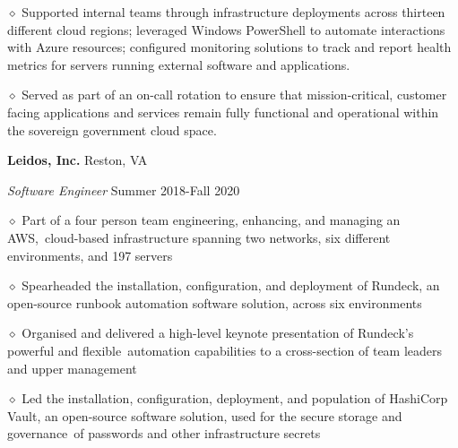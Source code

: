 \documentclass[executivepaper]{extarticle}
\begin{document}
\begin{center}
{\begin{minipage}{7.0in}
\vspace{0.25mm}

{\noindent $\diamond$ {\fontsize{12}{8}\selectfont Supported internal teams through infrastructure deployments across thirteen different cloud regions; leveraged Windows PowerShell to automate interactions with Azure resources; configured monitoring solutions to track and report health metrics for servers running external software and applications.}}

\vspace{0.25mm}

{\noindent $\diamond$ {\fontsize{12}{8}\selectfont Served as part of an on-call rotation to ensure that mission-critical, customer facing applications and services remain fully functional and operational within the sovereign government cloud space.}}

\vspace{2mm}

{\noindent \textbf{\fontsize{12}{8}\selectfont Leidos, Inc.}} {\hfill \fontsize{10}{8}\selectfont Reston, VA}

\vspace{0.5mm}

{\noindent \textit{\fontsize{12}{8}\selectfont Software Engineer}} {\hfill \fontsize{10}{8}\selectfont Summer 2018-Fall 2020}

\vspace{0.5mm}

{\noindent $\diamond$ {\fontsize{12}{8}\selectfont Part of a four person team engineering, enhancing, and managing an AWS, cloud-based infrastructure spanning two networks, six different environments, and 197 servers}}

\vspace{0.25mm}

{\noindent $\diamond$ {\fontsize{12}{8}\selectfont Spearheaded the installation, configuration, and deployment of Rundeck, an open-source runbook automation software solution, across six environments}}

\vspace{0.25mm}

{\noindent $\diamond$ {\fontsize{12}{8}\selectfont Organised and delivered a high-level keynote presentation of Rundeck's powerful and flexible automation capabilities to a cross-section of team leaders and upper management}}

\vspace{0.25mm}

{\noindent $\diamond$ {\fontsize{12}{8}\selectfont Led the installation, configuration, deployment, and population of HashiCorp Vault, an open-source software solution, used for the secure storage and governance of passwords and other infrastructure secrets}}


\end{minipage}}
\end{center}
\end{document}
